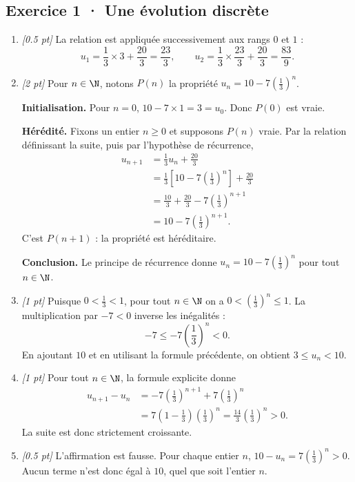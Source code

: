 \subsection*{Exercice 1 · Une évolution discrète}\begin{enumerate}

\item \textit{[\num{0,5} pt]} La relation est appliquée successivement aux rangs $0$ et $1$ :\[u_1=\frac{1}{3}\times 3+\frac{20}{3}=\frac{23}{3},\qquad u_2=\frac{1}{3}\times \frac{23}{3}+\frac{20}{3}=\frac{83}{9}.\]

\item \textit{[2 pt]} Pour $n\in\N$, notons $P(n)$ la propriété $u_n=10-7\left(\frac{1}{3}\right)^n$.
\par\smallskip\textbf{Initialisation.} Pour $n=0$, $10-7\times1=3=u_0$. Donc $P(0)$ est vraie.
\par\smallskip\textbf{Hérédité.} Fixons un entier $n\ge0$ et supposons $P(n)$ vraie. Par la relation définissant la suite, puis par l'hypothèse de récurrence,
\[\begin{aligned}u_{n+1}&=\frac{1}{3}u_n+\frac{20}{3}\\
&=\frac{1}{3}\left[10-7\left(\frac{1}{3}\right)^n\right]+\frac{20}{3}\\
&=\frac{10}{3}+\frac{20}{3}-7\left(\frac{1}{3}\right)^{n+1}\\
&=10-7\left(\frac{1}{3}\right)^{n+1}.
\end{aligned}\]
C'est $P(n+1)$ : la propriété est héréditaire.
\par\smallskip\textbf{Conclusion.} Le principe de récurrence donne $u_n=10-7\left(\frac{1}{3}\right)^n$ pour tout $n\in\N$.

\item \textit{[1 pt]} Puisque $0<\frac{1}{3}<1$, pour tout $n\in\N$ on a $0<(\frac{1}{3})^n\le1$. La multiplication par $-7<0$ inverse les inégalités :
\[-7\le-7(\frac{1}{3})^n<0.\]
En ajoutant $10$ et en utilisant la formule précédente, on obtient $3\le u_n<10$.

\item \textit{[1 pt]} Pour tout $n\in\N$, la formule explicite donne
\[\begin{aligned}u_{n+1}-u_n&=-7(\frac{1}{3})^{n+1}+7(\frac{1}{3})^n\\&=7(1-\frac{1}{3})(\frac{1}{3})^n=\frac{14}{3}(\frac{1}{3})^n>0.\end{aligned}\]
La suite est donc strictement croissante.

\item \textit{[\num{0,5} pt]} L'affirmation est fausse. Pour chaque entier $n$, $10-u_n=7(\frac{1}{3})^n>0$. Aucun terme n'est donc égal à $10$, quel que soit l'entier $n$.

\end{enumerate}

